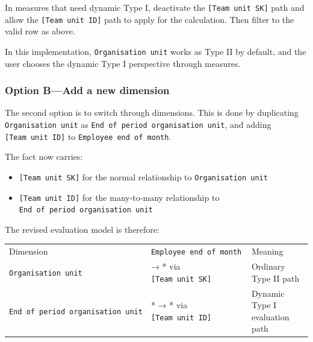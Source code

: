 \documentclass[10pt,openany,10pt]{book}
\providecommand{\tightlist}{%
  \setlength{\itemsep}{0pt}\setlength{\parskip}{0pt}}
\newcounter{none}
\let\podeToprule\toprule
\let\podeMidrule\midrule
\let\podeBottomrule\bottomrule
\renewcommand{\toprule}{\arrayrulecolor{pbiGrid}\podeToprule}
\renewcommand{\midrule}{\arrayrulecolor{pbiGrid}\podeMidrule}
\renewcommand{\bottomrule}{\arrayrulecolor{pbiGrid}\podeBottomrule}
\begin{document}
In measures that need dynamic Type I, deactivate the
\texttt{{[}Team\ unit\ SK{]}} path and allow the
\texttt{{[}Team\ unit\ ID{]}} path to apply for the calculation. Then
filter to the valid row as above.

In this implementation,
\texttt{\textquotesingle{}Organisation\ unit\textquotesingle{}} works as
Type II by default, and the user chooses the dynamic Type I perspective
through measures.

\subsubsection{Option B---Add a new
dimension}\label{option-badd-a-new-dimension}

The second option is to switch through dimensions. This is done by
duplicating
\texttt{\textquotesingle{}Organisation\ unit\textquotesingle{}} as
\texttt{\textquotesingle{}End\ of\ period\ organisation\ unit\textquotesingle{}},
and adding \texttt{{[}Team\ unit\ ID{]}} to
\texttt{\textquotesingle{}Employee\ end\ of\ month\textquotesingle{}}.

The fact now carries:

\begin{itemize}
\tightlist
\item
  \texttt{{[}Team\ unit\ SK{]}} for the normal relationship to
  \texttt{\textquotesingle{}Organisation\ unit\textquotesingle{}}
\item
  \texttt{{[}Team\ unit\ ID{]}} for the many-to-many relationship to
  \texttt{\textquotesingle{}End\ of\ period\ organisation\ unit\textquotesingle{}}
\end{itemize}

The revised evaluation model is therefore:

{\def\LTcaptype{none} %
\begin{longtable}[]{@{}
  >{\raggedright\arraybackslash}p{}
  >{\raggedright\arraybackslash}p{}
  >{\raggedright\arraybackslash}p{}@{}}
\toprule\noalign{}
\begin{minipage}[b]{\linewidth}\raggedright
Dimension
\end{minipage} & \begin{minipage}[b]{\linewidth}\raggedright
\texttt{\textquotesingle{}Employee\ end\ of\ month\textquotesingle{}}
\end{minipage} & \begin{minipage}[b]{\linewidth}\raggedright
Meaning
\end{minipage} \\
\midrule\noalign{}
\endhead
\bottomrule\noalign{}
\endlastfoot
\texttt{\textquotesingle{}Organisation\ unit\textquotesingle{}} & 1 → *
via \texttt{{[}Team\ unit\ SK{]}} & Ordinary Type II path \\
\texttt{\textquotesingle{}End\ of\ period\ organisation\ unit\textquotesingle{}}
& * → * via \texttt{{[}Team\ unit\ ID{]}} & Dynamic Type I evaluation
path \\
\end{longtable}
}
\end{document}
